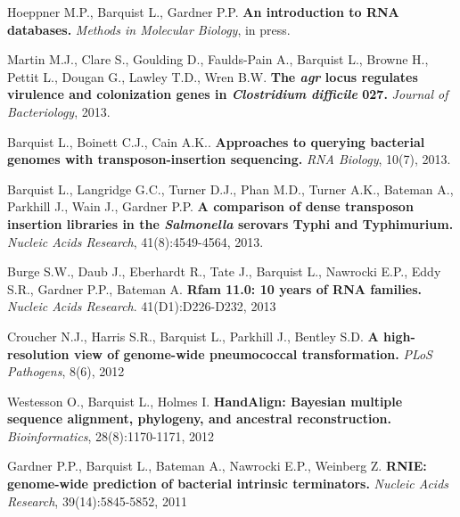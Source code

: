 \item{Hoeppner M.P., Barquist L., Gardner P.P. \textbf{An introduction to RNA databases.} \textit{Methods in Molecular Biology}, in press.} 

\item{Martin M.J., Clare S., Goulding D., Faulds-Pain A., Barquist L., Browne H., Pettit L., Dougan G., Lawley T.D.,  Wren B.W. \textbf{The \textit{agr} locus regulates virulence and colonization genes in \textit{Clostridium difficile} 027.} \textit{Journal of Bacteriology}, 2013. }

\item{Barquist L., Boinett C.J., Cain A.K..  \textbf{Approaches to querying bacterial genomes with transposon-insertion sequencing.} \textit{RNA Biology}, 10(7), 2013.}

\item{Barquist L., Langridge G.C., Turner D.J., Phan M.D., Turner A.K., Bateman A., Parkhill J., Wain J., Gardner P.P. \textbf{A comparison of dense transposon insertion libraries in the \textit{Salmonella} serovars Typhi and Typhimurium.} \textit{Nucleic Acids Research}, 41(8):4549-4564, 2013.} 

\item{Burge S.W., Daub J., Eberhardt R., Tate J., Barquist L., Nawrocki E.P., Eddy S.R., Gardner P.P., Bateman A. \textbf{Rfam 11.0: 10 years of RNA families.} \textit{Nucleic Acids Research}. 41(D1):D226-D232, 2013}

\item{Croucher N.J., Harris S.R., Barquist L., Parkhill J., Bentley S.D. \textbf{A high-resolution view of genome-wide pneumococcal transformation.} \textit{PLoS Pathogens}, 8(6), 2012}

\item{Westesson O., Barquist L., Holmes I. \textbf{HandAlign: Bayesian multiple sequence alignment, phylogeny, and ancestral reconstruction.} \textit{Bioinformatics}, 28(8):1170-1171, 2012}

\item{Gardner P.P., Barquist L., Bateman A., Nawrocki E.P., Weinberg Z. \textbf{RNIE: genome-wide prediction of bacterial intrinsic terminators.} \textit{Nucleic Acids Research}, 39(14):5845-5852, 2011}



 

